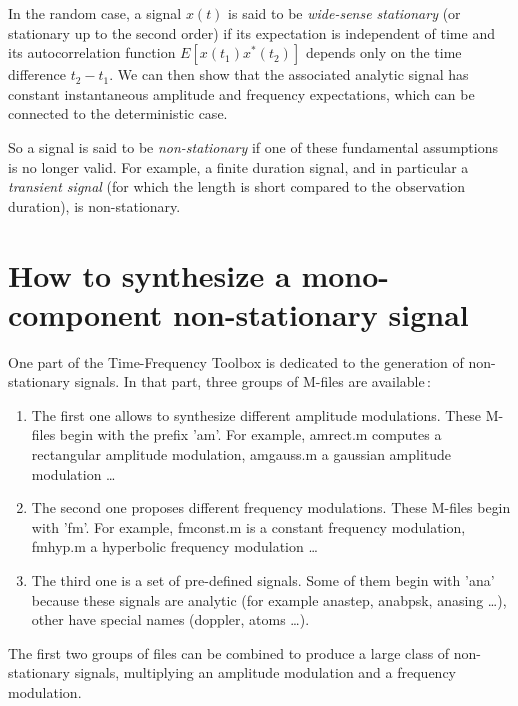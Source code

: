   In the random case, a signal $x(t)$ is said to be {\it wide-sense
stationary} (or stationary up to the second order) if its expectation is
independent of time and its autocorrelation function $E[x(t_1)x^*(t_2)]$
depends only on the time difference $t_2-t_1$. We can then show that the
associated analytic signal has constant instantaneous amplitude and
frequency expectations, which can be connected to the deterministic case.

So a signal is said to be {\it non-stationary} if one of these fundamental
assumptions is no longer valid. For example, a finite duration signal, and
in particular a {\it transient signal} (for which the length is short
compared to the observation duration), is non-stationary.


\section{How to synthesize a mono-component non-stationary signal}
  One part of the Time-Frequency Toolbox is dedicated to the generation of
non-stationary signals. In that part, three groups of M-files are available\,:

\begin{enumerate}
\item The first one allows to synthesize different amplitude
modulations. These M-files begin with the prefix '{\ttfamily am}'. For
example, {\ttfamily amrect.m} computes a rectangular amplitude modulation,
{\ttfamily amgauss.m} a gaussian amplitude modulation \ldots

\item The second one proposes different frequency modulations.  These
M-files begin with '{\ttfamily fm}'. For example, {\ttfamily fmconst.m} is
a constant frequency modulation, {\ttfamily fmhyp.m} a hyperbolic frequency
modulation \ldots

\item The third one is a set of pre-defined signals. Some of them begin
with '{\ttfamily ana}' because these signals are analytic (for example
{\ttfamily anastep, anabpsk, anasing} \ldots), other have special names
({\ttfamily doppler, atoms} \ldots).
\end{enumerate}

  The first two groups of files can be combined to produce a large class of
non-stationary signals, multiplying an amplitude modulation and a frequency
modulation.\\

